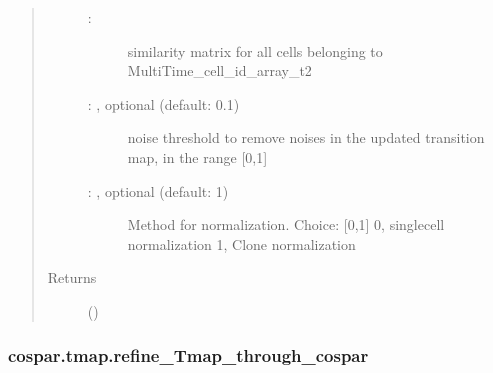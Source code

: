\documentclass[letterpaper,10pt,english]{sphinxmanual}
\begin{document}
\begin{fulllineitems}
\begin{quote}
\begin{description}
\begin{description}
\item[{ : }] \leavevmode
similarity matrix for all cells belonging
to MultiTime\_cell\_id\_array\_t2

\item[{ : , optional (default: 0.1)}] \leavevmode
noise threshold to remove noises in the updated transition map,
in the range {[}0,1{]}

\item[{ : , optional (default: 1)}] \leavevmode
Method for normalization. Choice: {[}0,1{]}
0, single\sphinxhyphen{}cell normalization
1, Clone normalization

\end{description}

\item[{Returns}] \leavevmode
{} ()

\end{description}\end{quote}

\end{fulllineitems}



\subsubsection{cospar.tmap.refine\_Tmap\_through\_cospar}
\label{\detokenize{cospar.tmap.refine_Tmap_through_cospar:cospar-tmap-refine-tmap-through-cospar}}\label{\detokenize{cospar.tmap.refine_Tmap_through_cospar::doc}}
\end{document}
